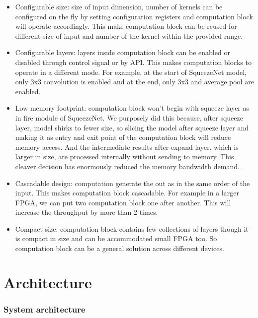 \documentclass[conference]{IEEEtran}
\begin{document}
\begin{itemize}
\item Configurable size: size of input dimension, number of kernels can be configured on the fly by setting configuration registers and computation block will operate accordingly. This make computation block can be reused for different size of input and number of the kernel within the provided range.

\item Configurable layers: layers inside computation block can be enabled or disabled through control signal or by API. This makes computation blocks to operate in a different mode. For example, at the start of SqueezeNet model, only 3x3 convolution is enabled and at the end, only 3x3 and average pool are enabled.

\item Low memory footprint: computation block won't begin with squeeze layer as in fire module of SqueezeNet. We purposely did this because, after squeeze layer, model shirks to fewer size, so slicing the model after squeeze layer and making it as entry and exit point of the computation block will reduce memory access. And the intermediate results after expand layer, which is larger in size, are processed internally without sending to memory. This cleaver decision has enormously reduced the memory bandwidth demand. 


\item Cascadable design: computation generate the out as in the same order of the input. This makes computation block cascadable. For example in a larger FPGA, we can put two computation block one after another. This will increase the throughput by more than 2 times.

\item Compact size: computation block contains few collections of layers though it is compact in size and can be accommodated small FPGA too. So computation block can be a general solution across different devices.

\end{itemize}

\section{Architecture}
\subsubsection{System architecture}
\end{document}
